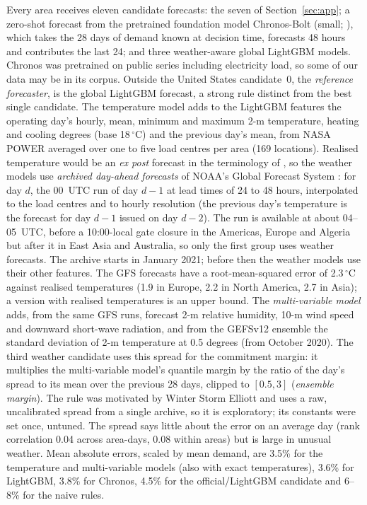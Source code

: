 Every area receives eleven candidate forecasts: the seven of Section~\ref{sec:app}; a zero-shot forecast from the pretrained foundation model Chronos-Bolt (small; \citealp{Ansari2024chronos}), which takes the 28 days of demand known at decision time, forecasts 48 hours and contributes the last 24; and three weather-aware global LightGBM models.
Chronos was pretrained on public series including electricity load, so some of our data may be in its corpus.
Outside the United States candidate~0, the \emph{reference forecaster}, is the global LightGBM forecast, a strong rule distinct from the best single candidate.
The temperature model adds to the LightGBM features the operating day's hourly, mean, minimum and maximum 2-m temperature, heating and cooling degrees (base 18\,$^\circ$C) and the previous day's mean, from NASA POWER \citep{NASAPOWER} averaged over one to five load centres per area (169 locations).
Realised temperature would be an \emph{ex post} forecast in the terminology of \citet{HongFan2016}, so the weather models use \emph{archived day-ahead forecasts} of NOAA's Global Forecast System \citep{GFSarchive}: for day $d$, the 00~UTC run of day $d-1$ at lead times of 24 to 48 hours, interpolated to the load centres and to hourly resolution (the previous day's temperature is the forecast for day $d-1$ issued on day $d-2$).
The run is available at about 04--05~UTC, before a 10:00-local gate closure in the Americas, Europe and Algeria but after it in East Asia and Australia, so only the first group uses weather forecasts.
The archive starts in January 2021; before then the weather models use their other features.
The GFS forecasts have a root-mean-squared error of 2.3\,$^\circ$C against realised temperatures (1.9 in Europe, 2.2 in North America, 2.7 in Asia); a version with realised temperatures is an upper bound.
The \emph{multi-variable model} adds, from the same GFS runs, forecast 2-m relative humidity, 10-m wind speed and downward short-wave radiation, and from the GEFSv12 ensemble \citep{GEFSv12,GEFSarchive} the standard deviation of 2-m temperature at 0.5 degrees (from October 2020).
The third weather candidate uses this spread for the commitment margin: it multiplies the multi-variable model's quantile margin by the ratio of the day's spread to its mean over the previous 28 days, clipped to $[0.5,3]$ (\emph{ensemble margin}).
The rule was motivated by Winter Storm Elliott and uses a raw, uncalibrated spread from a single archive, so it is exploratory; its constants were set once, untuned.
The spread says little about the error on an average day (rank correlation 0.04 across area-days, 0.08 within areas) but is large in unusual weather.
Mean absolute errors, scaled by mean demand, are 3.5\% for the temperature and multi-variable models (also with exact temperatures), 3.6\% for LightGBM, 3.8\% for Chronos, 4.5\% for the official/LightGBM candidate and 6--8\% for the naive rules.

